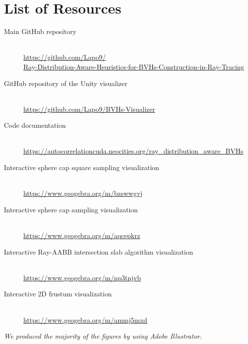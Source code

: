\documentclass{PoliMi_MasterThesis}
\begin{document}
\listoffigures
\listoftables

\chapter*{List of Resources}
\begin{description}
	\item[Main GitHub repository] \hfill\\ \url{https://github.com/Lapo9/}\\\url{Ray-Distribution-Aware-Heuristics-for-BVHs-Construction-in-Ray-Tracing}
	\item[GitHub repository of the Unity visualizer] \hfill\\ \url{https://github.com/Lapo9/BVHs-Visualizer}
	\item[Code documentation] \hfill\\ \url{https://autocorrelationcuda.neocities.org/ray_distribution_aware_BVHs}
	\item[Interactive sphere cap square sampling visualization] \hfill\\ \url{https://www.geogebra.org/m/bzswwgvj}
	\item[Interactive sphere cap sampling visualization] \hfill\\ \url{https://www.geogebra.org/m/aqcepkrz}
	\item[Interactive Ray-AABB intersection slab algorithm visualization] \hfill\\ \url{https://www.geogebra.org/m/np3tnjvb}
	\item[Interactive 2D frustum visualization] \hfill\\ \url{https://www.geogebra.org/m/ammj5mxd}
\end{description}
\textit{We produced the majority of the figures by using Adobe Illustrator.}

\end{document}
